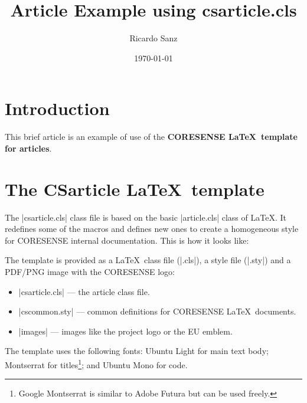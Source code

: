 \documentclass{csarticle}
\begin{document}

\title{Article Example using csarticle.cls}
\author{Ricardo Sanz}
\date{\today}

\maketitle

\tableofcontents


\section{Introduction} %

This brief article is an example of use of the \textbf{CORESENSE \LaTeX\ template for articles}. 

\section{The CSarticle \LaTeX\ template} %

The \code|csarticle.cls| class file is based on the basic \code|article.cls| class of \LaTeX. It redefines some of the macros and defines new ones to create a homogeneous style for CORESENSE internal documentation. This is how it looks like:

The template is provided as a \LaTeX\ class file (\code|.cls|), a style file (\code|.sty|) and a PDF/PNG image with the CORESENSE logo:

\begin{itemize}
\item \code|csarticle.cls| --- the article class file. 
\item \code|cscommon.sty| --- common definitions for CORESENSE \LaTeX\ documents.
\item \code|images| --- images like the project logo or the EU emblem.
\end{itemize}

The template uses the following fonts: Ubuntu Light for main text body; Montserrat for titles\footnote{Google Montserrat is similar to Adobe Futura but can be used freely.}; and {Ubuntu Mono} for code. 

\finalcover
\end{document}
